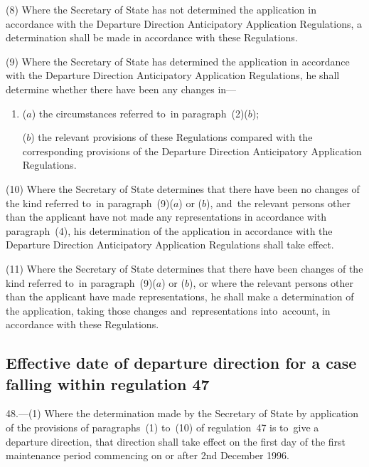 \documentclass[12pt,a4paper]{article}
\begin{document}
(8) Where the Secretary of State has not determined the application in
accordance with the Departure Direction Anticipatory Application Regulations, a
determination shall be made in accordance with these Regulations.

(9) Where the Secretary of State has determined the application in accordance
with the Departure Direction Anticipatory Application Regulations, he shall
determine whether there have been any changes in—
\begin{enumerate}\item[]
($a$) the circumstances referred to~in paragraph~(2)($b$);

($b$) the relevant provisions of these Regulations compared with the corresponding
provisions of the Departure Direction Anticipatory Application Regulations.
\end{enumerate}

(10) Where the Secretary of State determines that there have been no changes of
the kind referred to~in paragraph~(9)($a$) or ($b$), and~the relevant persons other
than the applicant have not made any representations in accordance with
paragraph~(4), his determination of the application in accordance with the
Departure Direction Anticipatory Application Regulations shall take effect.

(11) Where the Secretary of State determines that there have been changes of the
kind referred to~in paragraph~(9)($a$) or ($b$), or where the relevant persons other
than the applicant have made representations, he shall make a determination of
the application, taking those changes and~representations into~account, in
accordance with these Regulations.


\subsection[48. Effective date of departure direction for a case falling within regulation
47]{\sloppy Effective date of departure direction for a case falling within regulation
47}

48.—(1) Where the determination made by the Secretary of State by application
of the provisions of paragraphs~(1) to~(10) of regulation~47 is to~give a
departure direction, that direction shall take effect on the first day of the
first maintenance period commencing on or after 2nd December 1996.
\end{document}
